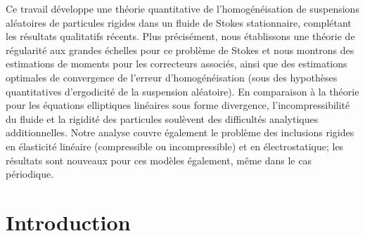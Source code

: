 \documentclass[JEP,XML,SOM,Unicode,published]{cedram}
\theoremstyle{plain}
\theoremstyle{definition}
\begin{document}




\begin{altabstract}
Ce travail développe une théorie quantitative de l’homogénéisation de suspensions aléatoires de particules rigides dans un fluide de Stokes stationnaire, complétant les résultats qualitatifs récents. Plus précisément, nous établissons une théorie de régularité aux grandes échelles pour ce problème de Stokes et nous montrons des estimations de moments pour les correcteurs associés, ainsi que des estimations optimales de convergence de l’erreur d'homogénéisation (sous des hypothèses quantitatives d’ergodicité de la suspension aléatoire). En comparaison à la théorie pour les équations elliptiques linéaires sous forme divergence, l’incompressibilité du fluide et la rigidité des particules soulèvent des difficultés analytiques additionnelles. Notre analyse couvre également le problème des inclusions rigides en élasticité linéaire (compressible ou incompressible) et en électrostatique; les résultats sont nouveaux pour ces modèles également, même dans le cas périodique.
\end{altabstract}

\maketitle
\vspace*{-\baselineskip}
\tableofcontents


\section{Introduction}
\end{document}
